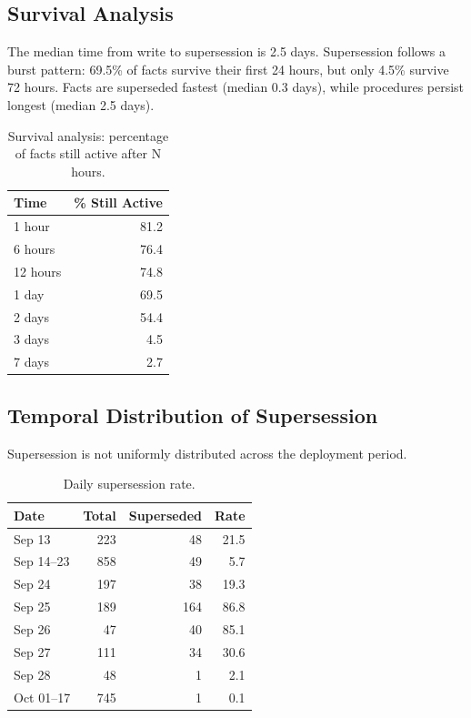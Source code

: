 \documentclass[sigconf,nonacm]{acmart}
\begin{document}
\subsection{Survival Analysis}
\label{sec:survival}

The median time from write to supersession is 2.5 days. Supersession follows a burst pattern: 69.5\% of facts survive their first 24 hours, but only 4.5\% survive 72 hours. Facts are superseded fastest (median 0.3 days), while procedures persist longest (median 2.5 days).


\begin{table}[h]
\centering
\caption{Survival analysis: percentage of facts still active after N hours.}
\begin{tabular}{lr}
\toprule
Time & \% Still Active \\
\midrule
1 hour & 81.2 \\
6 hours & 76.4 \\
12 hours & 74.8 \\
1 day & 69.5 \\
2 days & 54.4 \\
3 days & 4.5 \\
7 days & 2.7 \\
\bottomrule
\end{tabular}
\end{table}
\subsection{Temporal Distribution of Supersession}
\label{sec:time-dist}
Supersession is not uniformly distributed across the deployment period.

\begin{table}[h]
\centering
\caption{Daily supersession rate.}
\begin{tabular}{lrrr}
\toprule
Date & Total & Superseded & Rate \\
\midrule
Sep 13 & 223 & 48 & 21.5 \\
Sep 14--23 & 858 & 49 & 5.7 \\
Sep 24 & 197 & 38 & 19.3 \\
Sep 25 & 189 & 164 & 86.8 \\
Sep 26 & 47 & 40 & 85.1 \\
Sep 27 & 111 & 34 & 30.6 \\
Sep 28 & 48 & 1 & 2.1 \\
Oct 01--17 & 745 & 1 & 0.1 \\
\bottomrule
\end{tabular}
\end{table}
\end{document}
